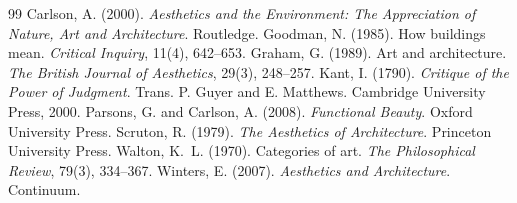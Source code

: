 \documentclass{situationist-preprint}
\begin{document}
\begin{thebibliography}{99}\small
{} Carlson, A. (2000). \emph{Aesthetics and the Environment: The Appreciation of Nature, Art and Architecture}. Routledge.
 Goodman, N. (1985). How buildings mean. \emph{Critical Inquiry}, 11(4), 642--653.
 Graham, G. (1989). Art and architecture. \emph{The British Journal of Aesthetics}, 29(3), 248--257.
 Kant, I. (1790). \emph{Critique of the Power of Judgment}. Trans. P. Guyer and E. Matthews. Cambridge University Press, 2000.
 Parsons, G. and Carlson, A. (2008). \emph{Functional Beauty}. Oxford University Press.
 Scruton, R. (1979). \emph{The Aesthetics of Architecture}. Princeton University Press.
 Walton, K.~L. (1970). Categories of art. \emph{The Philosophical Review}, 79(3), 334--367.
 Winters, E. (2007). \emph{Aesthetics and Architecture}. Continuum.
\end{thebibliography}
\end{document}
